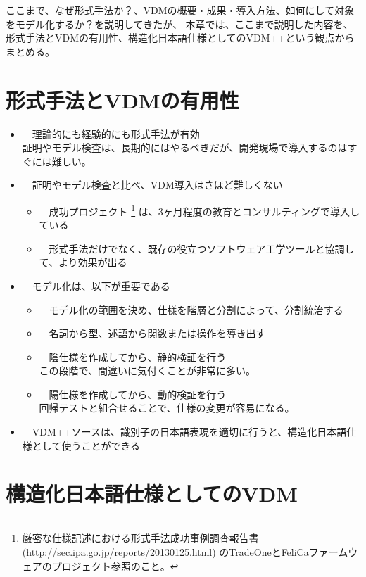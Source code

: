 	ここまで、なぜ形式手法か？、VDMの概要・成果・導入方法、如何にして対象をモデル化するか？を説明してきたが、
	本章では、ここまで説明した内容を、
	形式手法とVDMの有用性、構造化日本語仕様としてのVDM++という観点からまとめる。

\section{形式手法とVDMの有用性}
	\label{FMEfficency}

	\begin{itemize}
	\item　理論的にも経験的にも形式手法が有効 \\
		証明やモデル検査は、長期的にはやるべきだが、開発現場で導入するのはすぐには難しい。
	\item　証明やモデル検査と比べ、VDM導入はさほど難しくない
		\begin{itemize}
		\item　成功プロジェクト
			\footnote{厳密な仕様記述における形式手法成功事例調査報告書
				(\url{http://sec.ipa.go.jp/reports/20130125.html})
				のTradeOneとFeliCaファームウェアのプロジェクト参照のこと。}
			は、3ヶ月程度の教育とコンサルティングで導入している
		\item　形式手法だけでなく、既存の役立つソフトウェア工学ツールと協調して、より効果が出る
		\end{itemize} 
	\item　モデル化は、以下が重要である
		\begin{itemize}
		\item　モデル化の範囲を決め、仕様を階層と分割によって、分割統治する
		\item　名詞から型、述語から関数または操作を導き出す
		\item　陰仕様を作成してから、静的検証を行う \\
			この段階で、間違いに気付くことが非常に多い。
		\item　陽仕様を作成してから、動的検証を行う \\
			回帰テストと組合せることで、仕様の変更が容易になる。
		\end{itemize} 
	\item　VDM++ソースは、識別子の日本語表現を適切に行うと、構造化日本語仕様として使うことができる
	\end{itemize} 

\section{構造化日本語仕様としてのVDM}
	\label{VDMAsStructuredJapanese}

